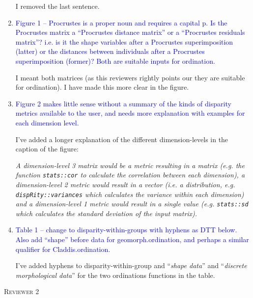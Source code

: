 \documentclass[12pt,letterpaper]{article}
\renewcommand{\section}[1]{%
\bigskip
\begin{center}
\begin{Large}
\normalfont\scshape #1
\medskip
\end{Large}
\end{center}}
\begin{document}
\begin{enumerate}
I removed the last sentence.

\item{\textcolor{blue}{Figure 1 – Procrustes is a proper noun and requires a capital p. Is the Procrustes matrix a “Procrustes distance matrix” or a “Procrustes residuals matrix”? i.e. is it the shape variables after a Procrustes superimposition (latter) or the distances between individuals after a Procrustes superimposition (former)? Both are suitable inputs for ordination.}}

I meant both matrices (as this reviewers rightly points our they are suitable for ordination). I have made this more clear in the figure.

\item{\textcolor{blue}{Figure 2 makes little sense without a summary of the kinds of disparity metrics available to the user, and needs more explanation with examples for each dimension level.}}

I've added a longer explanation of the different dimension-levels in the caption of the figure:

\textit{A dimension-level 3 matrix would be a metric resulting in a matrix (e.g. the function \texttt{stats::cor} to calculate the correlation between each dimension), a dimension-level 2 metric would result in a vector (i.e. a distribution, e.g. \texttt{dispRity::variances} which calculates the variance within each dimension) and a dimension-level 1 metric would result in a single value (e.g. \texttt{stats::sd} which calculates the standard deviation of the input matrix).}

\item{\textcolor{blue}{Table 1 – change to disparity-within-groups with hyphens as DTT below. Also add “shape” before data for geomorph.ordination, and perhaps a similar qualifier for Claddis.ordination.}}

I've added hyphens to disparity-within-group and ``\textit{shape data}'' and ``\textit{discrete morphological data}'' for the two ordinations functions in the table.


\end{enumerate}

\section{Reviewer 2}
\end{document}
